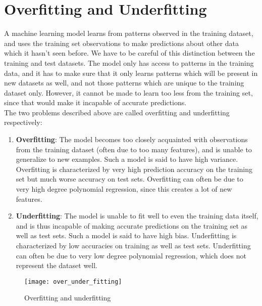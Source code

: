 \documentclass[a4paper, 12pt]{article}
\begin{document}
\section{Overfitting and Underfitting}
A machine learning model learns from patterns observed in the training dataset, and uses the training set observations to make predictions about other data which it hasn't seen before. We have to be careful of this distinction between the training and test datasets. The model only has access to patterns in the training data, and it has to make sure that it only learns patterns which will be present in new datasets as well, and not those patterns which are unique to the training dataset only. However, it cannot be made to learn too less from the training set, since that would make it incapable of accurate predictions. \\
\break
The two problems described above are called overfitting and underfitting respectively:
\begin{enumerate}
\item \textbf{Overfitting}: The model becomes too closely acquainted with observations from the training dataset (often due to too many features), and is unable to generalize to new examples. Such a model is said to have high variance. Overfitting is characterized by very high prediction accuracy on the training set but much worse accuracy on test sets. Overfitting can often be due to very high degree polynomial regression, since this creates a lot of new features.
\item \textbf{Underfitting}: The model is unable to fit well to even the training data itself, and is thus incapable of making accurate predictions on the training set as well as test sets. Such a model is said to have high bias. Underfitting is characterized by low accuracies on training as well as test sets. Underfitting can often be due to very low degree polynomial regression, which does not represent the dataset well.
\end{enumerate}
\begin{figure}[H]
\centering
\texttt{[image: over\_under\_fitting]}
\caption{Overfitting and underfitting}
\end{figure}
\end{document}
